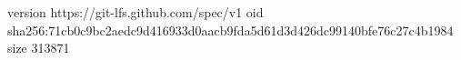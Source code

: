 version https://git-lfs.github.com/spec/v1
oid sha256:71cb0c9bc2aedc9d416933d0aacb9fda5d61d3d426dc99140bfe76c27c4b1984
size 313871
